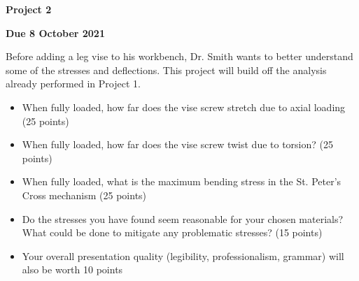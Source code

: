 \documentclass[12pt, oneside]{article}
\begin{document}
\begin{center}
\textbf{\Large Project 2}

\textbf{Due 8 October 2021}
\end{center}

Before adding a leg vise to his workbench, Dr. Smith wants to better understand some of the stresses and deflections.
This project will build off the analysis already performed in Project 1.
\begin{itemize}
	\item When fully loaded, how far does the vise screw stretch due to axial loading (25 points)
	\item When fully loaded, how far does the vise screw twist due to torsion? (25 points)
	\item When fully loaded, what is the maximum bending stress in the St. Peter's Cross mechanism (25 points)
	\item Do the stresses you have found seem reasonable for your chosen materials? What could be done to mitigate any problematic stresses? (15 points)
	\item Your overall presentation quality (legibility, professionalism, grammar) will also be worth 10 points
\end{itemize}
\end{document}
